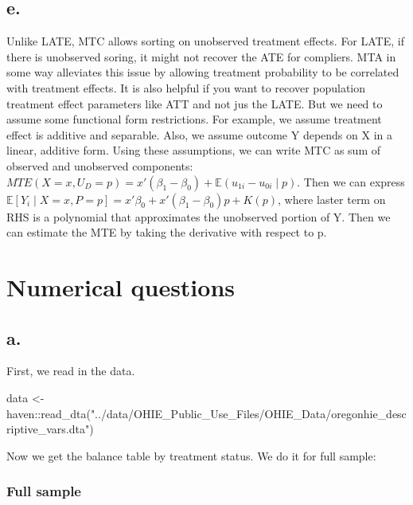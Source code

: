 \documentclass[
  letterpaper,
  DIV=11,
  numbers=noendperiod]{scrartcl}
\newenvironment{Shaded}{\begin{snugshade}}{\end{snugshade}}
\newcommand{\FunctionTok}[1]{\textcolor[rgb]{0.28,0.35,0.67}{#1}}
\newcommand{\NormalTok}[1]{\textcolor[rgb]{0.00,0.23,0.31}{#1}}
\newcommand{\OtherTok}[1]{\textcolor[rgb]{0.00,0.23,0.31}{#1}}
\newcommand{\SpecialCharTok}[1]{\textcolor[rgb]{0.37,0.37,0.37}{#1}}
\newcommand{\StringTok}[1]{\textcolor[rgb]{0.13,0.47,0.30}{#1}}
\begin{document}
\subsection{e.}\label{e.}

Unlike LATE, MTC allows sorting on unobserved treatment effects. For
LATE, if there is unobserved soring, it might not recover the ATE for
compliers. MTA in some way alleviates this issue by allowing treatment
probability to be correlated with treatment effects. It is also helpful
if you want to recover population treatment effect parameters like ATT
and not jus the LATE. But we need to assume some functional form
restrictions. For example, we assume treatment effect is additive and
separable. Also, we assume outcome Y depends on X in a linear, additive
form. Using these assumptions, we can write MTC as sum of observed and
unobserved components:
\(MTE(X=x, U_D = p) = x'(\beta_1 - \beta_0) + \mathbb{E}(u_{1i} - u_{0i} \mid p)\).
Then we can express
\(\mathbb{E}[Y_i \mid X = x, P = p] = x' \beta_0 + x' (\beta_1 - \beta_0)p + K(p)\),
where laster term on RHS is a polynomial that approximates the
unobserved portion of Y. Then we can estimate the MTE by taking the
derivative with respect to p.

\section{Numerical questions}\label{numerical-questions}

\subsection{a.}\label{a.-1}

First, we read in the data.

\begin{Shaded}
\begin{Highlighting}[]
\NormalTok{data }\OtherTok{\textless{}{-}}\NormalTok{ haven}\SpecialCharTok{::}\FunctionTok{read\_dta}\NormalTok{(}\StringTok{"../data/OHIE\_Public\_Use\_Files/OHIE\_Data/oregonhie\_descriptive\_vars.dta"}\NormalTok{)}
\end{Highlighting}
\end{Shaded}

Now we get the balance table by treatment status. We do it for full
sample:

\subsubsection{Full sample}\label{full-sample}
\end{document}
